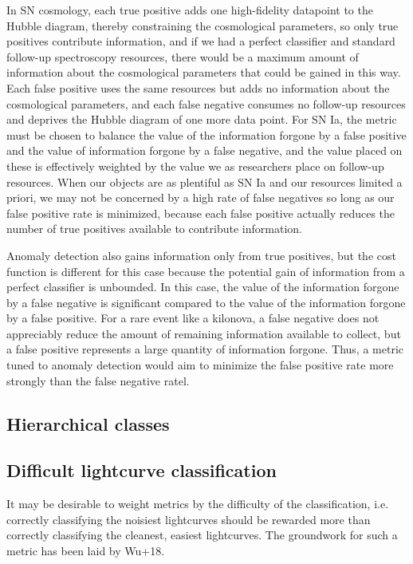 In SN cosmology, each true positive adds one high-fidelity datapoint to the Hubble diagram, thereby constraining the cosmological parameters, so only true positives contribute information, and if we had a perfect classifier and standard follow-up spectroscopy resources, there would be a maximum amount of information about the cosmological parameters that could be gained in this way.
Each false positive uses the same resources but adds no information about the cosmological parameters, and each false negative consumes no follow-up resources and deprives the Hubble diagram of one more data point.
For SN Ia, the metric must be chosen to balance the value of the information forgone by a false positive and the value of information forgone by a false negative, and the value placed on these is effectively weighted by the value we as researchers place on follow-up resources.
When our objects are as plentiful as SN Ia and our resources limited a priori, we may not be concerned by a high rate of false negatives so long as our false positive rate is minimized, because each false positive actually reduces the number of true positives available to contribute information.

Anomaly detection also gains information only from true positives, but the cost function is different for this case because the potential gain of information from a perfect classifier is unbounded.
In this case, the value of the information forgone by a false negative is significant compared to the value of the information forgone by a false positive.
For a rare event like a kilonova, a false negative does not appreciably reduce the amount of remaining information available to collect, but a false positive represents a large quantity of information forgone.
Thus, a metric tuned to anomaly detection would aim to minimize the false positive rate more strongly than the false negative ratel.

\subsection{Hierarchical classes}
\label{sec:hierarchical}


\subsection{Difficult lightcurve classification}
\label{sec:difficult}

It may be desirable to weight metrics by the difficulty of the classification, i.e. correctly classifying the noisiest lightcurves should be rewarded more than correctly classifying the cleanest, easiest lightcurves.
The groundwork for such a metric has been laid by Wu+18.
